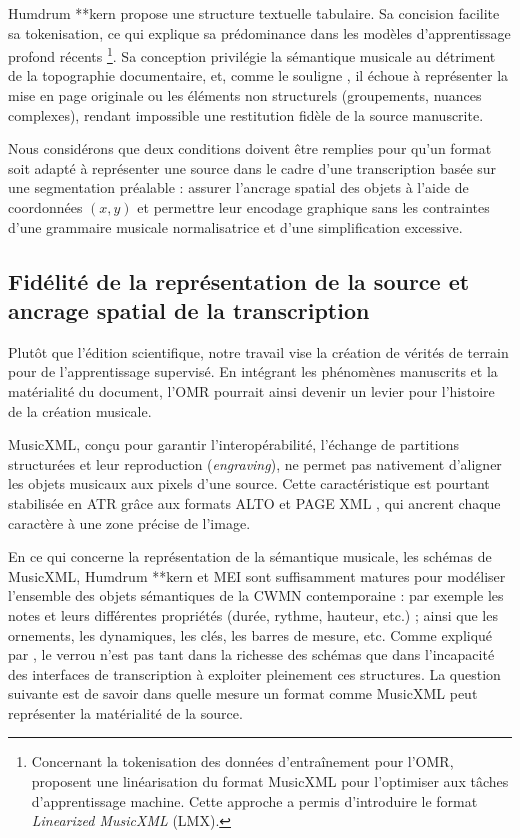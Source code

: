 \documentclass[final,fra]{anthology-ch} %
\begin{document}
Humdrum **kern propose une structure textuelle tabulaire. Sa concision facilite sa tokenisation, ce qui explique sa prédominance dans les modèles d'apprentissage profond récents \cite{rios-vila_sheet_2024, rios-vila_sheet_2024-1, cerveto-serrano_kernpy_2025}\footnote{Concernant la tokenisation des données d'entraînement pour l'OMR, \textcite{mayer_practical_2024} proposent une linéarisation du format MusicXML pour l'optimiser aux tâches d'apprentissage machine. Cette approche a permis d'introduire le format \textit{Linearized MusicXML} (LMX).}. Sa conception privilégie la sémantique musicale au détriment de la topographie documentaire, et, comme le souligne \textcite{torras_unified_2024}, il échoue à représenter la mise en page originale ou les éléments non structurels (groupements, nuances complexes), rendant impossible une restitution fidèle de la source manuscrite.

Nous considérons que deux conditions doivent être remplies pour qu'un format soit adapté à représenter une source dans le cadre d'une transcription basée sur une segmentation préalable : assurer l'ancrage spatial des objets à l'aide de coordonnées $(x, y)$ et permettre leur encodage graphique sans les contraintes d'une grammaire musicale normalisatrice et d'une simplification excessive. 

\subsection{Fidélité de la représentation de la source et ancrage spatial de la transcription}

Plutôt que l'édition scientifique, notre travail vise la création de vérités de terrain pour de l'apprentissage supervisé. En intégrant les phénomènes manuscrits et la matérialité du document, l'OMR pourrait ainsi devenir un levier pour l'histoire de la création musicale.

MusicXML, conçu pour garantir l'interopérabilité, l'échange de partitions structurées et leur reproduction (\textit{engraving}), ne permet pas nativement d'aligner les objets musicaux aux pixels d'une source. Cette caractéristique est pourtant stabilisée en ATR grâce aux formats ALTO et PAGE XML \cite{pletschacher_page_2010}, qui ancrent chaque caractère à une zone précise de l'image.

En ce qui concerne la représentation de la sémantique musicale, les schémas de MusicXML, Humdrum **kern et MEI sont suffisamment matures pour modéliser l'ensemble des objets sémantiques de la CWMN contemporaine : par exemple les notes et leurs différentes propriétés (durée, rythme, hauteur, etc.) ; ainsi que les ornements, les dynamiques, les clés, les barres de mesure, etc. Comme expliqué par \textcite{rettinghaus_pushing_2025}, le verrou n'est pas tant dans la richesse des schémas que dans l'incapacité des interfaces de transcription à exploiter pleinement ces structures. La question suivante est de savoir dans quelle mesure un format comme MusicXML peut représenter la matérialité de la source.
\end{document}
